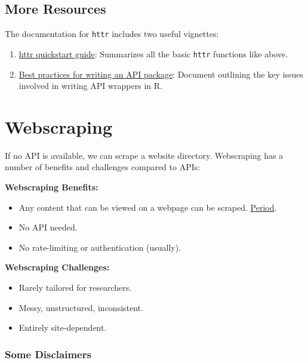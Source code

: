 \documentclass[
]{book}
\providecommand{\tightlist}{%
  \setlength{\itemsep}{0pt}\setlength{\parskip}{0pt}}
\begin{document}
\hypertarget{more-resources}{%
\subsection{More Resources}\label{more-resources}}

The documentation for \texttt{httr} includes two useful vignettes:

\begin{enumerate}
\def\labelenumi{\arabic{enumi}.}
\tightlist
\item
  \href{https://cran.r-project.org/web/packages/httr/vignettes/quickstart.html}{httr quickstart guide}: Summarizes all the basic \texttt{httr} functions like above.
\item
  \href{https://cran.r-project.org/web/packages/httr/vignettes/api-packages.html}{Best practices for writing an API package}: Document outlining the key issues involved in writing API wrappers in R.
\end{enumerate}

\hypertarget{webscraping}{%
\section{Webscraping}\label{webscraping}}

If no API is available, we can scrape a website directory. Webscraping has a number of benefits and challenges compared to APIs:

\textbf{Webscraping Benefits:}

\begin{itemize}
\tightlist
\item
  Any content that can be viewed on a webpage can be scraped. \href{https://blog.hartleybrody.com/web-scraping/}{Period}.
\item
  No API needed.
\item
  No rate-limiting or authentication (usually).
\end{itemize}

\textbf{Webscraping Challenges:}

\begin{itemize}
\tightlist
\item
  Rarely tailored for researchers.
\item
  Messy, unstructured, inconsistent.
\item
  Entirely site-dependent.
\end{itemize}

\hypertarget{some-disclaimers}{%
\subsubsection{Some Disclaimers}\label{some-disclaimers}}
\end{document}
